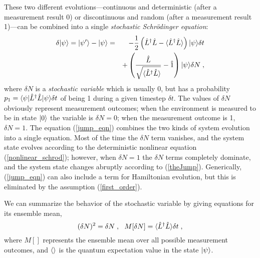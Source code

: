 These two different evolutions---continuous and deterministic (after
a measurement result 0) or discontinuous and random (after a
measurement result 1)---can be combined into a single {\it stochastic
Schr\"odinger equation}:
\begin{eqnarray}
\delta{| \psi \rangle} = {| \psi' \rangle} - {| \psi \rangle} &=&
  - {1\over2}\left({\hat L^\dagger}{\hat L} - {\langle {\hat L^\dagger}{\hat L} \rangle}\right) {| \psi \rangle} \delta t
  \nonumber\\
&& + \left( {{\hat L}\over \sqrt{{\langle {\hat L^\dagger}{\hat L} \rangle}}}
  - {\hat 1} \right){| \psi \rangle} \delta N \;,
\label{jump_eqn}
\end{eqnarray}
where $\delta N$ is a {\it stochastic variable} which is usually 0,
but has a probability $p_1 = {\langle \psi |}{\hat L^\dagger}{\hat L}{| \psi \rangle}\delta t$
of being 1 during a given timestep $\delta t$.
The values of $\delta N$ obviously represent
measurement outcomes; when the environment is measured to be in state
${| 0 \rangle}$ the variable is $\delta N=0$; when the measurement outcome is 1,
$\delta N=1$.  The equation (\ref{jump_eqn}) combines the two kinds of
system evolution into a single equation.  Most of the time the $\delta N$
term vanishes, and the system state evolves according to the
deterministic nonlinear equation (\ref{nonlinear_schrod}); however, when
$\delta N=1$ the $\delta N$ terms completely dominate, and the system state
changes abruptly according to (\ref{theJump}).  Generically, (\ref{jump_eqn})
can also include a term for Hamiltonian evolution, but this is
eliminated by the assumption (\ref{first_order}).

We can summarize the behavior of the stochastic variable by giving
equations for its ensemble mean,
\begin{equation}
(\delta N)^2 = \delta N \;, \ \ M[\delta N] = {\langle {\hat L^\dagger}{\hat L} \rangle}\delta t \;,
\end{equation}
where $M[]$ represents the ensemble mean over all possible measurement
outcomes, and ${\langle  \rangle}$ is the quantum expectation value in the state
${| \psi \rangle}$.

